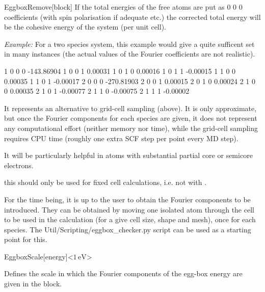 \begin{fdfentry}{EggboxRemove}[block]
  If the total energies of the free atoms are put as 0 0 0
  coefficients (with spin polarisation if adequate etc.) the corrected
  total energy will be the cohesive energy of the system (per unit
  cell).

  \emph{Example:} For a two species system, this example would give a
  quite sufficent set in many instances (the actual values of the
  Fourier coefficients are not realistic).
  \begin{fdfexample}
       1   0   0   0 -143.86904
       1   0   0   1    0.00031
       1   0   1   0    0.00016
       1   0   1   1   -0.00015
       1   1   0   0    0.00035
       1   1   0   1   -0.00017
       2   0   0   0 -270.81903
       2   0   0   1    0.00015
       2   0   1   0    0.00024
       2   1   0   0    0.00035
       2   1   0   1   -0.00077
       2   1   1   0   -0.00075
       2   1   1   1   -0.00002
  \end{fdfexample}

  It represents an alternative to grid-cell sampling (above).  It is
  only approximate, but once the Fourier components for each species
  are given, it does not represent any computational effort (neither
  memory nor time), while the grid-cell sampling requires CPU time
  (roughly one extra SCF step per point every MD step).

  It will be particularly helpful in atoms with substantial partial
  core or semicore electrons.

  \note this should only be used for fixed cell calculations, i.e. not
  with .

  For the time being, it is up to the user to obtain the Fourier
  components to be introduced. They can be obtained by moving one
  isolated atom through the cell to be used in the calculation (for a
  give cell size, shape and mesh), once for each species.  The
  Util/Scripting/eggbox\_checker.py script can be used as a starting
  point for this.

\end{fdfentry}

\begin{fdfentry}{EggboxScale}[energy]<$1\,\mathrm{eV}$>

  Defines the scale in which the Fourier components of the egg-box
  energy are given in the  block.

\end{fdfentry}

